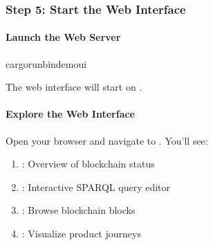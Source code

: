 \documentclass[letterpaper,10pt,english]{sphinxmanual}
\begin{document}
\subsubsection{Step 5: Start the Web Interface}
\label{\detokenize{tutorials/first-supply-chain:step-5-start-the-web-interface}}

\paragraph{Launch the Web Server}
\label{\detokenize{tutorials/first-supply-chain:launch-the-web-server}}
\begin{sphinxVerbatim}[commandchars=\\\{\}]
cargorun\PYGZhy{}\PYGZhy{}bindemo\PYGZus{}ui
\end{sphinxVerbatim}

\sphinxAtStartPar
The web interface will start on .


\paragraph{Explore the Web Interface}
\label{\detokenize{tutorials/first-supply-chain:explore-the-web-interface}}
\sphinxAtStartPar
Open your browser and navigate to . You’ll see:
\begin{enumerate}
%
\item {} 
\sphinxAtStartPar
{}: Overview of blockchain status

\item {} 
\sphinxAtStartPar
{}: Interactive SPARQL query editor

\item {} 
\sphinxAtStartPar
{}: Browse blockchain blocks

\item {} 
\sphinxAtStartPar
{}: Visualize product journeys

\end{enumerate}
\end{document}
